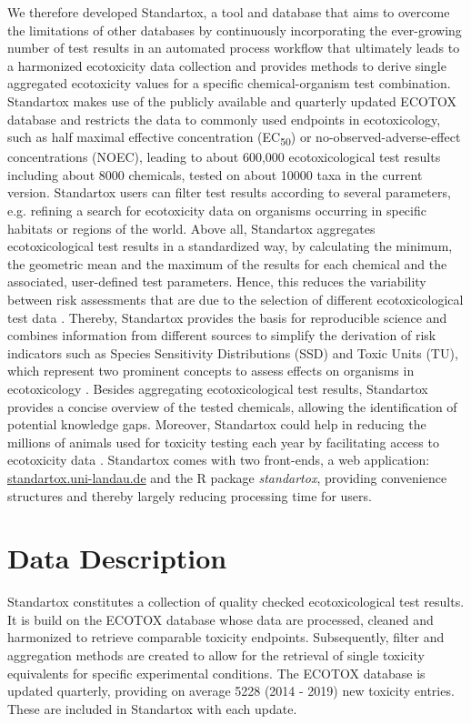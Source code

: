 \documentclass[journal,datadescriptor,accept,moreauthors,pdftex]{Definitions/mdpi}
\begin{document}
We therefore developed Standartox, a tool and database that aims to overcome the limitations of other databases by continuously incorporating the ever-growing number of test results in an automated process workflow that ultimately leads to a harmonized ecotoxicity data collection and provides methods to derive single aggregated ecotoxicity values for a specific chemical-organism test combination. Standartox makes use of the publicly available and quarterly updated ECOTOX database \citep{usepa_ecotox_2019} and restricts the data to commonly used endpoints in ecotoxicology, such as half maximal effective concentration (EC\textsubscript{50}) or no-observed-adverse-effect concentrations (NOEC), leading to about 600,000 ecotoxicological test results including about 8000 chemicals, tested on about 10000 taxa in the current version. Standartox users can filter test results according to several parameters, e.g. refining a search for ecotoxicity data on organisms occurring in specific habitats or regions of the world. Above all, Standartox aggregates ecotoxicological test results in a standardized way, by calculating the minimum, the geometric mean and the maximum of the results for each chemical and the associated, user-defined test parameters. Hence, this reduces the variability between risk assessments that are due to the selection of different ecotoxicological test data \citep{mark_analysis_1998}. Thereby, Standartox provides the basis for reproducible science and combines information from different sources to simplify the derivation of risk indicators such as Species Sensitivity Distributions (SSD) and Toxic Units (TU), which represent two prominent concepts to assess effects on organisms in ecotoxicology \citep{posthuma_species_2002, kefford_definition_2011, schafer_effects_2011}. Besides aggregating ecotoxicological test results, Standartox provides a concise overview of the tested chemicals, allowing the identification of potential knowledge gaps. Moreover, Standartox could help in reducing the millions of animals used for toxicity testing each year by facilitating access to ecotoxicity data \citep{hartung_chemical_2009}. Standartox comes with two front-ends, a web application: \url{standartox.uni-landau.de} and the R \citep{rcoreteam_language_2017} package \textit{standartox}, providing convenience structures and thereby largely reducing processing time for users.

\section{Data Description}
Standartox constitutes a collection of quality checked ecotoxicological test results. It is build on the ECOTOX database \citep{usepa_ecotox_2019} whose data are processed, cleaned and harmonized to retrieve comparable toxicity endpoints. Subsequently, filter and aggregation methods are created to allow for the retrieval of single toxicity equivalents for specific experimental conditions. The ECOTOX database is updated quarterly, providing on average 5228 (2014 - 2019) new toxicity entries. These are included in Standartox with each update.
\end{document}
